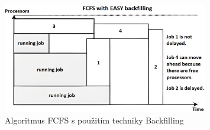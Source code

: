 \begin{figure}
	\centering
	\includegraphics[width=0.8\textwidth]{Figures/fcfs-web.png}
	\caption{Algoritmus FCFS s použitím techniky Backfilling \cite{GomezMartin2016}}
	\label{fig:fcfs-with-backfilling}
\end{figure}
